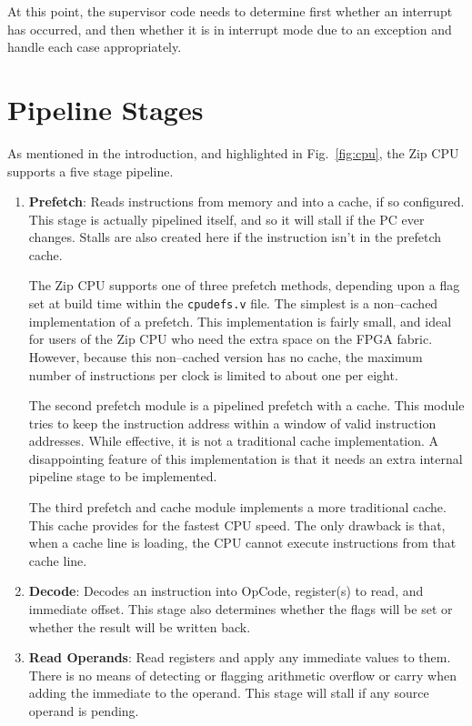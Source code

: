 \documentclass{gqtekspec}
\begin{document}
At this point, the supervisor code needs to determine first whether an 
interrupt has occurred, and then whether it is in interrupt mode due to 
an exception and handle each case appropriately.

\section{Pipeline Stages}
As mentioned in the introduction, and highlighted in Fig.~\ref{fig:cpu},
the Zip CPU supports a five stage pipeline.
\begin{enumerate}
\item {\bf Prefetch}: Reads instructions from memory and into a cache, if so 
	configured.  This
	stage is actually pipelined itself, and so it will stall if the PC
	ever changes.  Stalls are also created here if the instruction isn't
	in the prefetch cache.

	The Zip CPU supports one of three prefetch methods, depending upon a
	flag set at build time within the {\tt cpudefs.v} file.  The simplest
	is a non--cached implementation of a prefetch.  This implementation is
	fairly small, and ideal for users of the Zip CPU who need the extra
	space on the FPGA fabric.  However, because this non--cached version
	has no cache, the maximum number of instructions per clock is limited
	to about one per eight.

	The second prefetch module is a pipelined prefetch with a cache.  This
	module tries to keep the instruction address within a window of valid
	instruction addresses.  While effective, it is not a traditional
	cache implementation.  A disappointing feature of this implementation
	is that it needs an extra internal pipeline stage to be implemented.

	The third prefetch and cache module implements a more traditional
	cache.  This cache provides for the fastest CPU speed.  The only
	drawback is that, when a cache line is loading, the CPU cannot
	execute instructions from that cache line.

\item {\bf Decode}: Decodes an instruction into OpCode, register(s) to read,
	and immediate offset.  This stage also determines whether the flags
	will be set or whether the result will be written back.

\item {\bf Read Operands}: Read registers and apply any immediate values to
	them.  There is no means of detecting or flagging arithmetic overflow
	or carry when adding the immediate to the operand.  This stage will
	stall if any source operand is pending.


\end{enumerate}
\end{document}
